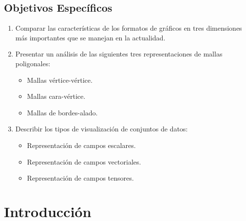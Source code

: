 \documentclass[11pt,letterpaper]{article}     %
\begin{document}
\subsection{Objetivos Espec\' ificos} 
\begin{enumerate}
\item Comparar las caracter\' isticas de los formatos de gr\' aficos en tres dimensiones m\' as importantes que se manejan en la actualidad.
\item Presentar un an\' alisis de las siguientes tres representaciones de mallas poligonales:
	\begin{itemize}
	\item Mallas v\' ertice-v\' ertice.
	\item Mallas cara-v\' ertice.
	\item Mallas de bordes-alado.
	\end{itemize}

%

\item Describir los tipos de visualizaci\' on de conjuntos de datos:
	\begin{itemize}
	\item Representaci\' on de campos escalares.
	\item Representaci\' on de campos vectoriales.
	\item Representaci\' on de campos tensores.
	\end{itemize}
	
\end{enumerate}

\section{Introducci\' on}
\end{document}
